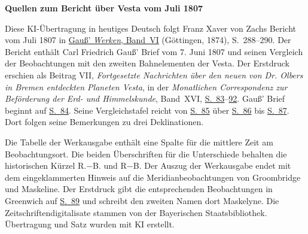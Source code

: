 \clearpage\thispagestyle{empty}
\begin{center}\textbf{Quellen zum Bericht über Vesta vom Juli 1807}\end{center}
\noindent Diese KI-Übertragung in heutiges Deutsch folgt Franz Xaver von Zachs Bericht vom Juli 1807 in \href{https://gdz.sub.uni-goettingen.de/id/PPN236007467}{Gauß’ \textit{Werken}, Band~VI} (Göttingen, 1874), S.~288--290. Der Bericht enthält Carl Friedrich Gauß’ Brief vom 7. Juni 1807 und seinen Vergleich der Beobachtungen mit den zweiten Bahnelementen der Vesta. Der Erstdruck erschien als Beitrag VII, \textit{Fortgesetzte Nachrichten über den neuen von Dr. Olbers in Bremen entdeckten Planeten Vesta}, in der \textit{Monatlichen Correspondenz zur Beförderung der Erd- und Himmelskunde}, Band~XVI, \href{https://www.digitale-sammlungen.de/en/view/bsb10538607?page=91}{S.~83}--\href{https://www.digitale-sammlungen.de/en/view/bsb10538607?page=100}{92}. Gauß’ Brief beginnt auf \href{https://www.digitale-sammlungen.de/en/view/bsb10538607?page=92}{S.~84}. Seine Vergleichstafel reicht von \href{https://www.digitale-sammlungen.de/en/view/bsb10538607?page=93}{S.~85} über \href{https://www.digitale-sammlungen.de/en/view/bsb10538607?page=94}{S.~86} bis \href{https://www.digitale-sammlungen.de/en/view/bsb10538607?page=95}{S.~87}. Dort folgen seine Bemerkungen zu drei Deklinationen.
\par\medskip
Die Tabelle der Werkausgabe enthält eine Spalte für die mittlere Zeit am Beobachtungsort. Die beiden Überschriften für die Unterschiede behalten die historischen Kürzel R.$-$B. und R$-$B. Der Auszug der Werkausgabe endet mit dem eingeklammerten Hinweis auf die Meridianbeobachtungen von Groombridge und Maskeline. Der Erstdruck gibt die entsprechenden Beobachtungen in Greenwich auf \href{https://www.digitale-sammlungen.de/en/view/bsb10538607?page=97}{S.~89} und schreibt den zweiten Namen dort Maskelyne. Die Zeitschriftendigitalisate stammen von der Bayerischen Staatsbibliothek. Übertragung und Satz wurden mit KI erstellt.
\clearpage
